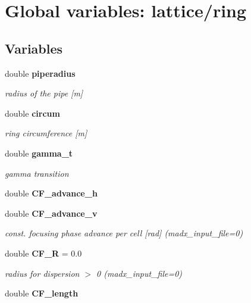 \section{Global variables: lattice/ring}
\label{group__Lattice}
\subsection*{Variables}
\begin{CompactItemize}
\item 
double {\bf piperadius}\label{group__Lattice_a0}

\begin{CompactList}\small\item\em radius of the pipe [m]\item\end{CompactList}\item 
double {\bf circum}\label{group__Lattice_a1}

\begin{CompactList}\small\item\em ring circumference [m]\item\end{CompactList}\item 
double {\bf gamma\_\-t}\label{group__Lattice_a2}

\begin{CompactList}\small\item\em gamma transition\item\end{CompactList}\item 
double {\bf CF\_\-advance\_\-h}\label{group__Lattice_a3}

\item 
double {\bf CF\_\-advance\_\-v}\label{group__Lattice_a4}

\begin{CompactList}\small\item\em const. focusing phase advance per cell [rad] (madx\_\-input\_\-file=0)\item\end{CompactList}\item 
double {\bf CF\_\-R} = 0.0\label{group__Lattice_a5}

\begin{CompactList}\small\item\em radius for dispersion $>$ 0 (madx\_\-input\_\-file=0)\item\end{CompactList}\item 
double {\bf CF\_\-length}\label{group__Lattice_a6}


\end{CompactItemize}
